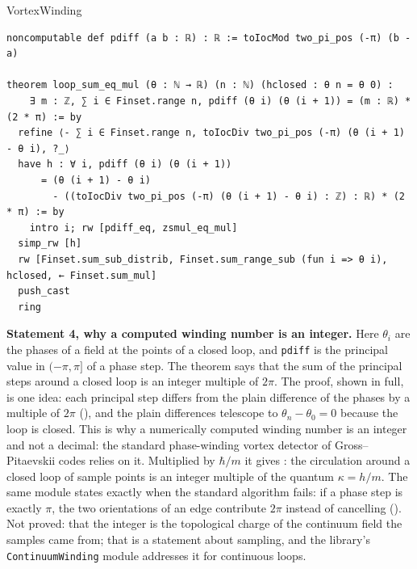 \begin{leanbox}[title={Lean 4 \enspace Statement 4 \enspace VortexWinding}]{VortexWinding}
\begin{lstlisting}[style=lean,basicstyle=\ttfamily\footnotesize]
noncomputable def pdiff (a b : ℝ) : ℝ := toIocMod two_pi_pos (-π) (b - a)

theorem loop_sum_eq_mul (θ : ℕ → ℝ) (n : ℕ) (hclosed : θ n = θ 0) :
    ∃ m : ℤ, ∑ i ∈ Finset.range n, pdiff (θ i) (θ (i + 1)) = (m : ℝ) * (2 * π) := by
  refine ⟨- ∑ i ∈ Finset.range n, toIocDiv two_pi_pos (-π) (θ (i + 1) - θ i), ?_⟩
  have h : ∀ i, pdiff (θ i) (θ (i + 1))
      = (θ (i + 1) - θ i)
        - ((toIocDiv two_pi_pos (-π) (θ (i + 1) - θ i) : ℤ) : ℝ) * (2 * π) := by
    intro i; rw [pdiff_eq, zsmul_eq_mul]
  simp_rw [h]
  rw [Finset.sum_sub_distrib, Finset.sum_range_sub (fun i => θ i), hclosed, ← Finset.sum_mul]
  push_cast
  ring
\end{lstlisting}
\end{leanbox}
\textbf{Statement 4, why a computed winding number is an integer.} Here $\theta_i$ are the phases of a field at the points of a closed loop, and \texttt{pdiff} is the principal value in $(-\pi,\pi]$ of a phase step. The theorem says that the sum of the principal steps around a closed loop is an integer multiple of $2\pi$. The proof, shown in full, is one idea: each principal step differs from the plain difference of the phases by a multiple of $2\pi$ (), and the plain differences telescope to $\theta_n-\theta_0=0$ because the loop is closed. This is why a numerically computed winding number is an integer and not a decimal: the standard phase-winding vortex detector of Gross--Pitaevskii codes relies on it. Multiplied by $\hbar/m$ it gives : the circulation around a closed loop of sample points is an integer multiple of the quantum $\kappa=h/m$. The same module states exactly when the standard algorithm fails: if a phase step is exactly $\pi$, the two orientations of an edge contribute $2\pi$ instead of cancelling (). Not proved: that the integer is the topological charge of the continuum field the samples came from; that is a statement about sampling, and the library's \texttt{ContinuumWinding} module addresses it for continuous loops.

